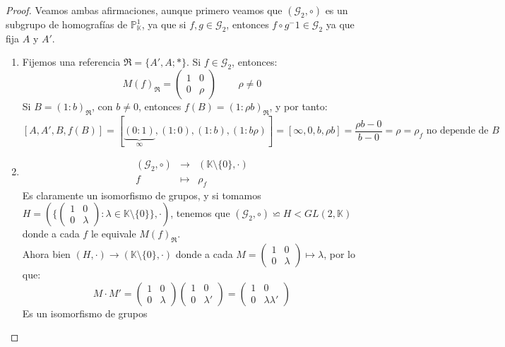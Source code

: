 \begin{proof}
    Veamos ambas afirmaciones, aunque primero veamos que $(\mathcal{G}_2, \circ)$ es un subgrupo de homografías de $\mathbb{P}^1_{\mathbb{K}}$, ya que si $f,g \in \mathcal{G}_2$, entonces $f \circ g^-1 \in \mathcal{G}_2$ ya que fija $A$ y $A'$.
    \begin{enumerate}
        \item Fijemos una referencia $\mathfrak{R} = \{A', A; *\}$. Si $f \in \mathcal{G}_2$, entonces:
        \[
        M(f)_{\mathfrak{R}} =
        \begin{pmatrix}
            1 & 0 \\
            0 & \rho
        \end{pmatrix}
        \, \qquad
        \rho \neq 0
        \]
        Si $B = (1:b)_\mathfrak{R}$, con $b \neq 0$, entonces $f(B) = (1: \rho b)_\mathfrak{R}$, y por tanto:
        \[
        \left[ A, A', B, f(B) \right] =
        \left[ \underbrace{(0:1)}_{\infty}, (1:0), (1:b), (1:b \rho) \right] =
        [\infty, 0, b, \rho b] =
        \frac{\rho b - 0}{b-0} = \rho = 
        \rho_f \text{ no depende de } B
        \]
        \item
        \[
        \begin{array}{ccc}
            (\mathcal{G}_2, \circ) & \longrightarrow & (\mathbb{K} \setminus \{0\}, \cdot) \\
            f & \mapsto & \rho_f
        \end{array}
        \]
        Es claramente un isomorfismo de grupos, y si tomamos $H = \left( \{ \begin{pmatrix}
            1 & 0 \\ 0 & \lambda
        \end{pmatrix} : \lambda \in \mathbb{K} \setminus \{0\} \}, \cdot \right)$, tenemos que $(\mathcal{G}_2, \circ) \backsimeq H < GL(2, \mathbb{K})$ donde a cada $f$ le equivale $M(f)_{\mathfrak{R}}$.\\
        Ahora bien $(H, \cdot) \longrightarrow (\mathbb{K} \setminus \{0\}, \cdot)$ donde a cada $M= \begin{pmatrix}
            1 & 0 \\ 0 & \lambda
        \end{pmatrix} \mapsto \lambda$, por lo que:
        \[
        M \cdot M' =
        \begin{pmatrix}
            1 & 0 \\ 0 & \lambda
        \end{pmatrix}
        \begin{pmatrix}
            1 & 0 \\ 0 & \lambda'
        \end{pmatrix} =
        \begin{pmatrix}
            1 & 0 \\ 0 & \lambda \lambda'
        \end{pmatrix}
        \]
        Es un isomorfismo de grupos
    \end{enumerate}
\end{proof}


